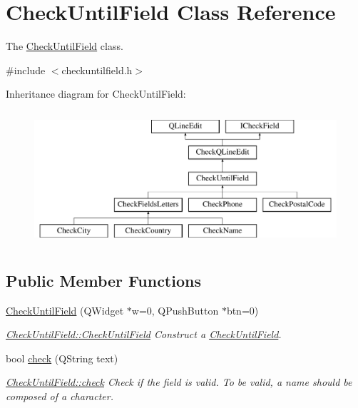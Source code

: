 \hypertarget{classCheckUntilField}{\section{Check\+Until\+Field Class Reference}
\label{classCheckUntilField}
}


The \hyperlink{classCheckUntilField}{Check\+Until\+Field} class.  




{\ttfamily \#include $<$checkuntilfield.\+h$>$}

Inheritance diagram for Check\+Until\+Field\+:\begin{figure}[H]
\begin{center}
\leavevmode
\includegraphics[height=5.000000cm]{dc/db9/classCheckUntilField}
\end{center}
\end{figure}
\subsection*{Public Member Functions}
\begin{DoxyCompactItemize}
\item 
\hyperlink{classCheckUntilField_a7b3789fe02959e488b35a0e79362f786}{Check\+Until\+Field} (Q\+Widget $\ast$w=0, Q\+Push\+Button $\ast$btn=0)
\begin{DoxyCompactList}\small\item\em \hyperlink{classCheckUntilField_a7b3789fe02959e488b35a0e79362f786}{Check\+Until\+Field\+::\+Check\+Until\+Field} Construct a \hyperlink{classCheckUntilField}{Check\+Until\+Field}. \end{DoxyCompactList}\item 
bool \hyperlink{classCheckUntilField_acfb9e2f95bebcb5b5d2337e3ac4f4d47}{check} (Q\+String text)
\begin{DoxyCompactList}\small\item\em \hyperlink{classCheckUntilField_acfb9e2f95bebcb5b5d2337e3ac4f4d47}{Check\+Until\+Field\+::check} Check if the field is valid. To be valid, a name should be composed of a character. \end{DoxyCompactList}\end{DoxyCompactItemize}
